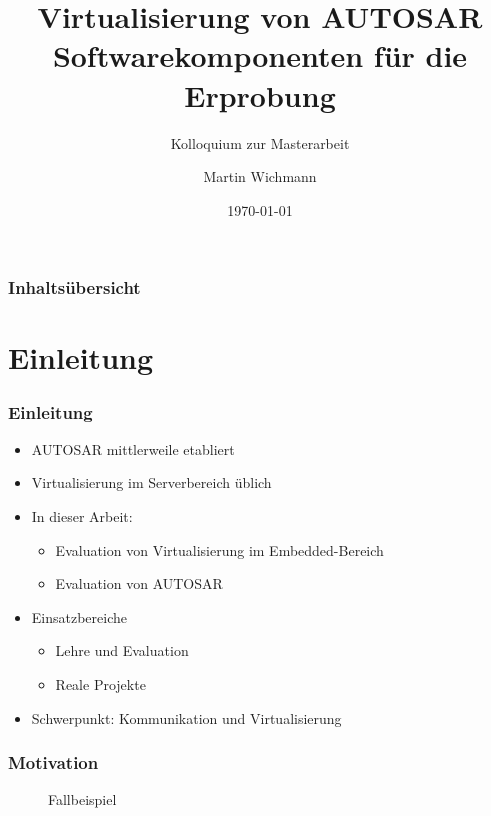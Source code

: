 \documentclass[]{beamer}
\author{Martin Wichmann}
\title[Virtualisierung von AUTOSAR Softwarekomponenten]{Virtualisierung von AUTOSAR Softwarekomponenten für die Erprobung}
\subtitle{Kolloquium zur Masterarbeit}
\date{\today}
\institute{Ostfalia Hochschule für angewandte Wissenschaften}
\newcommand{\inputImage}[1]{}
\begin{document}
\begin{frame}
\maketitle
\end{frame}


\begin{frame}
\frametitle{Inhaltsübersicht}
\tableofcontents[hideallsubsections] %
\end{frame}





\section{Einleitung}
\label{sec:einleitung}

\begin{frame}
\frametitle{Einleitung}
    \begin{itemize}
        \item AUTOSAR mittlerweile etabliert
        \item Virtualisierung im Serverbereich üblich
        \item In dieser Arbeit:
        \begin{itemize}
            \item Evaluation von Virtualisierung im Embedded-Bereich
            \item Evaluation von AUTOSAR
        \end{itemize}
        \item Einsatzbereiche
        \begin{itemize}
            \item Lehre und Evaluation
            \item Reale Projekte
        \end{itemize}
        \item Schwerpunkt: Kommunikation und Virtualisierung
    \end{itemize}
\end{frame}



\begin{frame}
\frametitle{Motivation}
    \begin{figure}[ht]
        \centering
        \resizebox{0.9\linewidth}{!}{\inputImage{arch_begin.dia}}
        \caption{Fallbeispiel}
        \label{fig:fallbeispiel}
    \end{figure}
\end{frame}
\end{document}
